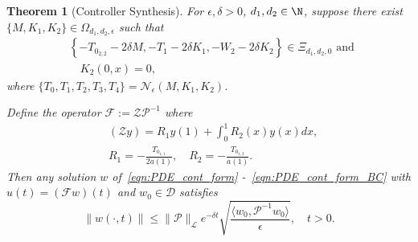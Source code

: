 \documentclass[9pt,journal,twocolumn]{IEEEtran}
\newtheorem{theorem}{Theorem}
\newcommand{\igzo}{\int_0^1}
\begin{document}
\begin{theorem}[Controller Synthesis]\label{thm:synthesis}
For $\epsilon,\delta>0$, $d_1, d_2 \in \N$, suppose there exist $\{M,K_1,K_2\} \in \Omega_{d_1,d_2,\epsilon}$ such that
\begin{align*}
&\left\{-T_{0_{2,2}}-2 \delta M,-T_1-2 \delta K_1, -W_2-2 \delta K_2\right\} \in \Xi_{d_1,d_2,0}\text{ and } \\
& \quad K_2(0,x)=0,
\end{align*}where
$\{T_0,T_1,T_2,T_3,T_4\}=\mathcal{N}_\epsilon(M,K_1,K_2)$.

Define the operator $\mathcal{F}:=\mathcal{Z}\mathcal{P}^{-1}$ where
\begin{align*}
&(\mathcal{Z}y)=R_1y(1)+\igzo R_2(x)y(x)dx,\\
& R_1=-\frac{T_{0_{1,1}}}{2 a(1)}, \quad R_2=-\frac{T_{0_{1,2}}}{a(1)}.
\end{align*}
Then any solution $w$ of~\eqref{eqn:PDE_cont_form} -~\eqref{eqn:PDE_cont_form_BC} with $u(t)=(\mathcal{F}w)(t)$ and $w_0 \in \mathcal{D}$ satisfies
\[
  \|w(\cdot,t) \| \leq \|\mathcal{P}\|_\mathcal{L} e^{-\delta t} \sqrt{\frac{\langle w_0,\mathcal{P}^{-1}w_0 \rangle}{\epsilon}}, \quad t>0.
\]
 \end{theorem}
\end{document}

